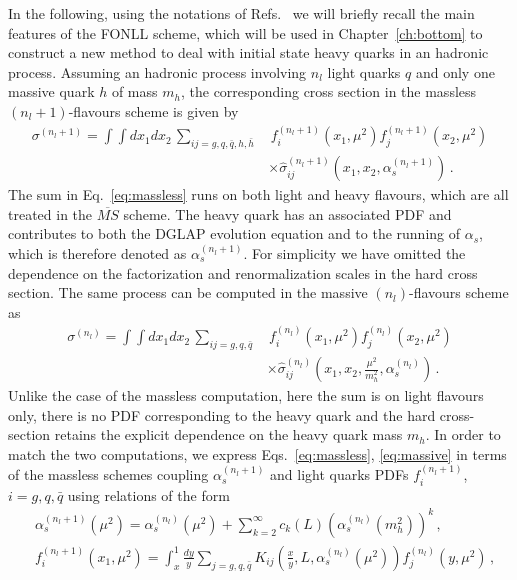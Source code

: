 %
In the following, using the notations of Refs.~\cite{Forte:2010ta,Forte:2015hba} we will briefly recall 
the main features of the FONLL scheme, which will be used in
Chapter~\ref{ch:bottom} to construct a new method to deal with initial state heavy quarks in an hadronic process.
Assuming an hadronic process involving $n_l$ light quarks $q$  and only one massive quark $h$ of mass $m_h$,
the corresponding cross section in the massless $(n_l+1)$-flavours scheme is given by
\begin{align}
    \label{eq:massless}
    \sigma^{(n_l+1)} = \int \int dx_1 dx_2\, \sum_{ij=g,q,\bar{q},h,\bar{h}}&\, 
    f_i^{(n_l+1)}\left(x_1,\mu^2\right)f_j^{(n_l+1)}\left(x_2,\mu^2\right) \nonumber \\
    &\times\hat{\sigma}^{(n_l+1)}_{ij}\left(x_1,x_2,\alpha_s^{(n_l+1)}\right)\,.
\end{align}
The sum in Eq.~\ref{eq:massless} runs on both light and heavy flavours, which are all treated in the
$\overline{MS}$ scheme. The heavy quark has an associated PDF and contributes to both the
DGLAP evolution equation and to the running of $\alpha_s$, which is therefore denoted as $\alpha_s^{(n_l+1)}$. 
For simplicity we have omitted the
dependence on the factorization and renormalization scales in the hard cross section.
The same process can be computed in the massive $(n_l)$-flavours scheme as
\begin{align}
    \label{eq:massive}
    \sigma^{(n_l)} = \int \int dx_1 dx_2\, \sum_{ij=g,q,\bar{q}}&\, 
    f_i^{(n_l)}\left(x_1,\mu^2\right)f_j^{(n_l)}\left(x_2,\mu^2\right) \nonumber \\
    &\times\hat{\sigma}^{(n_l)}_{ij}\left(x_1,x_2,\frac{\mu^2}{m_h^2},\alpha_s^{(n_l)}\right)\,.
\end{align}
Unlike the case of the massless computation, here the sum is on light flavours only, there is no PDF corresponding
to the heavy quark and the hard cross-section retains the explicit dependence on the heavy quark mass $m_h$.
In order to match the two computations, we express Eqs.~\ref{eq:massless}, \ref{eq:massive} in terms of 
the massless schemes coupling $\alpha_s^{(n_l+1)}$ and light quarks PDFs $f^{(n_l+1)}_i$,
$i = g,q,\bar{q}$ using relations of the form
\begin{align}
    \label{eq:matching_alpha}
    &\alpha_s^{(n_l+1)}\left(\mu^2\right) = 
    \alpha_s^{(n_l)}\left(\mu^2\right) 
    + \sum_{k=2}^{\infty} c_k\left(L\right) \left(\alpha_s^{(n_l)}\left(m_h^2\right)\right)^k\,, \\
    \label{eq:matching_PDFs}
    &f_i^{(n_l+1)}\left(x_1,\mu^2\right) = \int_x^1 \frac{dy}{y} 
    \sum_{j=g,q,\bar{q}} K_{ij}\left(\frac{x}{y}, L, \alpha_s^{(n_l)}\left(\mu^2\right)\right) f_j^{(n_l)}\left(y,\mu^2\right)\,,
\end{align}

